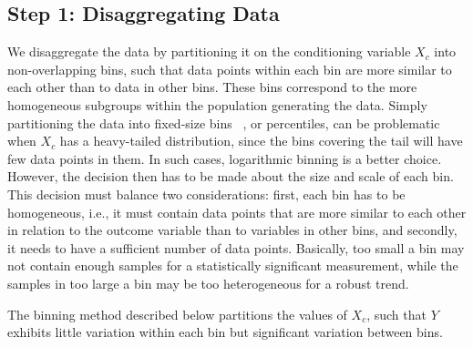 \documentclass[letterpaper]{article} %
\begin{document}
\subsection{Step 1: Disaggregating Data}
We disaggregate the data by partitioning it on the conditioning variable $X_c$  into non-overlapping bins, such that data points within each bin are more similar to each other than to data in other bins. These bins correspond to the more homogeneous subgroups within the population generating the data. Simply partitioning the data into fixed-size bins ~\cite{Alipourfard2018}, or percentiles, can be problematic when $X_c$ has a heavy-tailed distribution, since the bins covering the tail will have few data points in them. In such cases, logarithmic binning is a better choice. However, the decision then has to be made about the size and scale of each bin. This decision must balance two considerations: first, each bin has to be homogeneous, i.e., it must contain data points that are more similar to each other in relation to the outcome variable than to variables in other bins, and secondly, it needs to have a sufficient number of data points. Basically, too small a bin may not contain enough samples for a statistically significant measurement, while the samples in too large a bin may be too heterogeneous for a robust trend.

The binning method described below partitions the values of $X_c$, such that $Y$ exhibits little variation within each bin but significant variation between bins.
\end{document}
